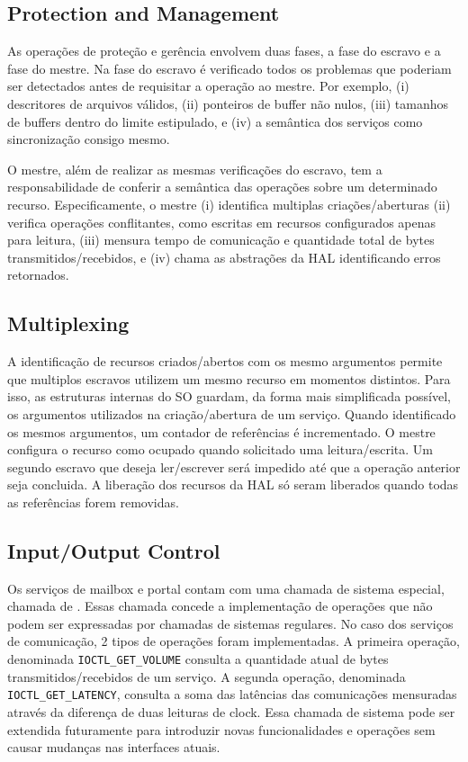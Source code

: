 		\subsection{Protection and Management}

			As operações de proteção e gerência envolvem duas fases, a fase do escravo e a fase do mestre.
			Na fase do escravo é verificado todos os problemas que poderiam ser detectados antes de requisitar a operação ao mestre.
			Por exemplo,
			(i) descritores de arquivos válidos,
			(ii) ponteiros de buffer não nulos,
			(iii) tamanhos de buffers dentro do limite estipulado, e
			(iv) a semântica dos serviços como sincronização consigo mesmo.
			
			O mestre, além de realizar as mesmas verificações do escravo, tem a responsabilidade de conferir a semântica das operações sobre um determinado recurso.
			Especificamente, o mestre
			(i) identifica multiplas criações/aberturas
			(ii) verifica operações conflitantes, como escritas em recursos configurados apenas para leitura,
			(iii) mensura tempo de comunicação e quantidade total de bytes transmitidos/recebidos, e
			(iv) chama as abstrações da HAL identificando erros retornados.

		\subsection{Multiplexing}

			A identificação de recursos criados/abertos com os mesmo argumentos permite que multiplos escravos utilizem um mesmo recurso em momentos distintos.
			Para isso, as estruturas internas do SO guardam, da forma mais simplificada possível, os argumentos utilizados na criação/abertura de um serviço.
			Quando identificado os mesmos argumentos, um contador de referências é incrementado.
			O mestre configura o recurso como ocupado quando solicitado uma leitura/escrita.
			Um segundo escravo que deseja ler/escrever será impedido até que a operação anterior seja concluida.
			A liberação dos recursos da HAL só seram liberados quando todas as referências forem removidas.

		\subsection{Input/Output Control}

			Os serviços de mailbox e portal contam com uma chamada de sistema especial, chamada de \ioctl.
			Essas chamada concede a implementação de operações que não podem ser expressadas por chamadas de sistemas regulares.
			No caso dos serviços de comunicação, 2 tipos de operações foram implementadas.
			A primeira operação, denominada \texttt{IOCTL\_GET\_VOLUME} consulta a quantidade atual de bytes transmitidos/recebidos de um serviço.
			A segunda operação, denominada \texttt{IOCTL\_GET\_LATENCY}, consulta a soma das latências das comunicações mensuradas através da diferença de duas leituras de clock.
			Essa chamada de sistema pode ser extendida futuramente para introduzir novas funcionalidades e operações sem causar mudanças nas interfaces atuais.

